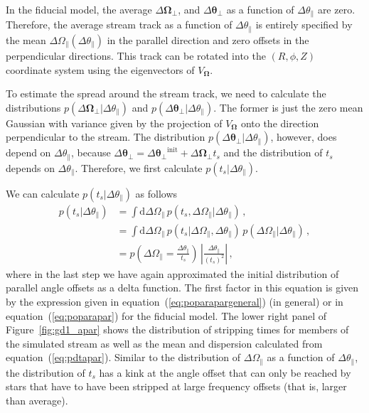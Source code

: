 \documentclass[12pt,preprint]{aastex}
\newcommand{\dd}{\mathrm{d}}
\newcommand{\eqnname}{equation}
\newcommand{\equationname}{\eqnname}
\renewcommand{\figurename}{Figure}
\renewcommand{\vec}[1]{\ensuremath{\mathbf{#1}}}
\newcommand{\veco}{\ensuremath{\vec{\Omega}}}
\newcommand{\veca}{\ensuremath{\boldsymbol\theta}}
\newcommand{\apar}{\ensuremath{\theta_\parallel}}
\newcommand{\opar}{\ensuremath{\Omega_\parallel}}
\newcommand{\aperp}{\ensuremath{\veca_\perp}}
\newcommand{\operp}{\ensuremath{\veco_\perp}}
\newcommand{\ts}{\ensuremath{t_s}}
\begin{document}
In the fiducial model, the average $\Delta \operp$, and $\Delta
\aperp$ as a function of $\Delta \apar$ are zero. Therefore, the
average stream track as a function of $\Delta \apar$ is entirely
specified by the mean $\Delta \opar(\Delta \apar)$ in the parallel
direction and zero offsets in the perpendicular directions. This track
can be rotated into the $(R,\phi,Z)$ coordinate system using the
eigenvectors of $V_\veco$.

To estimate the spread around the stream track, we need to calculate
the distributions $p(\Delta \operp|\Delta \apar)$ and $p(\Delta
\aperp|\Delta \apar)$. The former is just the zero mean Gaussian with
variance given by the projection of $V_\veco$ onto the direction
perpendicular to the stream. The distribution $p(\Delta \aperp|\Delta
\apar)$, however, does depend on $\Delta \apar$, because $\Delta
\aperp = \Delta \aperp^{\mathrm{init}} + \Delta \operp \ts$ and
the distribution of $\ts$ depends on $\Delta \apar$. Therefore,
we first calculate $p(\ts | \Delta \apar)$.

We can calculate $p(\ts | \Delta \apar)$ as follows
\begin{equation}\label{eq:pdtapar}
\begin{split}
  p(\ts | \Delta \apar) & = \int \dd \Delta \opar\,p(\ts,\Delta \opar|\Delta \apar)\,,\\
  & = \int \dd \Delta \opar\,p(\ts|\Delta \opar,\Delta \apar)\,p(\Delta \opar|\Delta \apar)\,,\\
  & = p\left(\Delta \opar = \frac{\Delta \apar}{\ts}\right)\,\left|\frac{\Delta \apar}{(\ts)^2}\right|\,,
\end{split}
\end{equation}
where in the last step we have again approximated the initial
distribution of parallel angle offsets as a delta function. The first
factor in this equation is given by the expression given in
\equationname~(\ref{eq:poparapargeneral}) (in general) or in
\equationname~(\ref{eq:poparapar}) for the fiducial model. The lower
right panel of \figurename~\ref{fig:gd1_apar} shows the distribution
of stripping times for members of the simulated stream as well as the
mean and dispersion calculated from
\equationname~(\ref{eq:pdtapar}). Similar to the distribution of
$\Delta \opar$ as a function of $\Delta \apar$, the distribution of
$\ts$ has a kink at the angle offset that can only be reached by stars
that have to have been stripped at large frequency offsets (that is,
larger than average).
\end{document}
